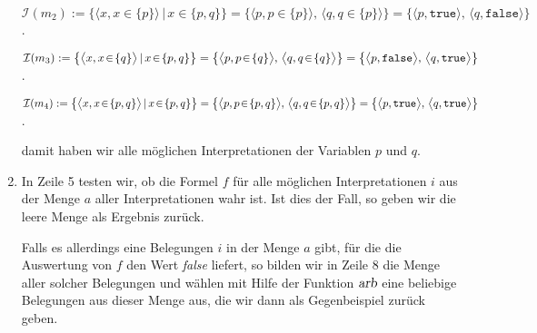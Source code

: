 \begin{enumerate}
      $\mathcal{I}(m_2) := \bigl\{ \bigl\langle x, x \!\in\! \{p\} \bigl\rangle\, |\, x \!\in\! \{p,q\} \bigr\} = \bigl\{ \bigl\langle p, p \!\in\! \{p\} \bigl\rangle,\, \bigl\langle q, q \!\in\! \{p\} \bigl\rangle \bigr\} = \bigl\{ \bigl\langle p, \mathtt{true} \bigl\rangle,\, \bigl\langle q, \mathtt{false} \bigl\rangle \bigr\}$.

      ${\cal I}(m_3) := \bigl\{ \bigl\langle x, x \!\in\! \{q\} \bigl\rangle\, |\, x \!\in\! \{p,q\} \bigr\} = \bigl\{ \bigl\langle p, p \!\in\! \{q\} \bigl\rangle,\, \bigl\langle q, q \!\in\! \{q\} \bigl\rangle \bigr\} = \bigl\{ \bigl\langle p, \mathtt{false} \bigl\rangle,\, \bigl\langle q, \mathtt{true} \bigl\rangle \bigr\}$.

      ${\cal I}(m_4) := \bigl\{ \bigl\langle x, x \!\in\! \{p,q\} \bigl\rangle\, |\, x \!\in\! \{p,q\} \bigr\} = \bigl\{ \bigl\langle p, p \!\in\! \{p,q\} \bigl\rangle,\, \bigl\langle q, q \!\in\! \{p,q\} \bigl\rangle \bigr\} = \bigl\{ \bigl\langle p, \mathtt{true} \bigl\rangle,\, \bigl\langle q, \mathtt{true} \bigl\rangle \bigr\}$.

      damit haben wir alle m\"{o}glichen Interpretationen der Variablen $p$ und $q$. 
\item In Zeile 5 testen wir, ob die Formel $f$ f\"{u}r alle m\"{o}glichen Interpretationen $i$
      aus der Menge $a$ aller Interpretationen wahr ist.  Ist dies der Fall,
      so geben wir die leere Menge als Ergebnis zur\"{u}ck.

      Falls es allerdings eine Belegungen $i$ in der Menge $a$ gibt, f\"{u}r die die
      Auswertung von $f$ den Wert \textsl{false} liefert, so bilden wir in Zeile 8 die
      Menge aller solcher Belegungen und w\"{a}hlen mit Hilfe der Funktion
      $\textsl{arb}$ eine beliebige Belegungen aus dieser Menge aus, die wir dann
      als Gegenbeispiel zur\"{u}ck geben.
\end{enumerate}

